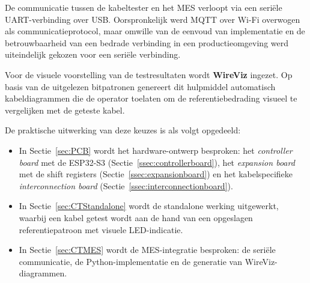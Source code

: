 De communicatie tussen de kabeltester en het \gls{MES} verloopt via een seriële \acrshort{UART}-verbinding over USB. Oorspronkelijk werd \gls{MQTT} over Wi-Fi overwogen als communicatieprotocol, maar omwille van de eenvoud van implementatie en de betrouwbaarheid van een bedrade verbinding in een productieomgeving werd uiteindelijk gekozen voor een seriële verbinding.

Voor de visuele voorstelling van de testresultaten wordt \textbf{WireViz} ingezet. Op basis van de uitgelezen bitpatronen genereert dit hulpmiddel automatisch kabeldiagrammen die de operator toelaten om de referentiebedrading visueel te vergelijken met de geteste kabel.

De praktische uitwerking van deze keuzes is als volgt opgedeeld:
\begin{itemize}
    \item In Sectie~\ref{sec:PCB} wordt het hardware-ontwerp besproken: het \textit{controller board} met de ESP32-S3 
    (Sectie~\ref{ssec:controllerboard}), het \textit{expansion board} met de shift registers (Sectie~\ref{ssec:expansionboard}) en het kabelspecifieke \textit{interconnection board} (Sectie~\ref{ssec:interconnectionboard}).
    \item In Sectie~\ref{sec:CTStandalone} wordt de standalone werking uitgewerkt, waarbij een kabel getest wordt aan de hand van een opgeslagen referentiepatroon met visuele LED-indicatie.
    \item In Sectie~\ref{sec:CTMES} wordt de \gls{MES}-integratie besproken: de seriële communicatie, de Python-implementatie en de generatie van WireViz-diagrammen.
\end{itemize}
